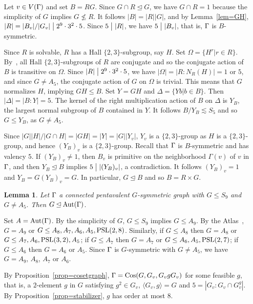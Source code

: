 \documentclass[12pt]{article}
\newtheorem{lem}{Lemma}[section]%
\def\di{\bigm|} \def\lg{\langle} \def\rg{\rangle}
\def\f{\noindent}
\def\PSL{\hbox{\rm PSL}}\def\PSU{\hbox{\rm PSU}}
\def\Aut{\hbox{\rm Aut}}
\def\Cos{\hbox{\rm Cos}}
\newcommand{\qed}{\mbox{\raisebox{0.7ex}{\fbox{}}} \vspace{4truemm}}
\begin{document}
\f {\bf Proof:} Let $v \in V(\Gamma)$ and set $B=RG$. Since $G\cap R\unlhd G$, we have  $G\cap R=1$ because the simplicity of $G$ implies $G\not\leq R$. It follows $|B|=|R||G|$, and by Lemma~\ref{lem=GH}, $|R|=|B_v|/|G_v|\di 2^9\cdot 3^2\cdot 5$. Since $5 \di |R|$, we have $5\di |B_v|$, that is, $\Gamma$ is $B$-symmetric.

Since $R$ is solvable, $R$ has a Hall $\{2,3\}$-subgroup, say $H$. Set $\Omega=\{H^r|r\in R\}$. By~\cite{Hall}, all Hall $\{2,3\}$-subgroups of $R$ are conjugate and so the conjugate action of $B$ is transitive on $\Omega$. Since $|R|\di 2^9\cdot 3^2\cdot 5$, we have $|\Omega|=|R:N_R(H)|=1$
or $5$, and since $G\neq A_5$, the conjugate action of $G$ on $\Omega$ is trivial. This means that $G$ normalizes $H$, implying $GH\leq B$. Set $Y=GH$ and $\Delta=\{Yb|b \in B\}$. Then $|\Delta|=|B:Y|=5$. The kernel of the right multiplication action of $B$ on $\Delta$ is $Y_B$, the largest normal subgroup of $B$ contained in $Y$. It follows $B/Y_B \lesssim S_5$ and so $G\leq Y_B$, as $G\neq A_5$.

Since $|G||H|/|G\cap H|=|GH|=|Y|=|G||Y_v|$, $Y_v$ is a $\{2,3\}$-group as $H$ is a $\{2,3\}$-group, and hence $(Y_B)_v$ is a $\{2,3\}$-group. Recall that $\Gamma$ is $B$-symmetric and has valency $5$.
If $(Y_B)_v\not=1$, then $B_v$ is primitive on the neighborhood $\Gamma(v)$ of $v$ in $\Gamma$, and then $Y_B\unlhd B$ implies $5\di |(Y_B)_v|$, a contradiction. It follows $(Y_B)_v=1$ and $Y_B=G(Y_B)_v=G$. In particular, $G\unlhd B$ and so $B=R\times G$.
\hfill\qed

\begin{lem}\label{lem=S_9}
Let $\Gamma$ a connected pentavalent $G$-symmetric graph with $G\leq S_9$ and $G\neq A_5$. Then $G\unlhd \Aut(\G)$.
\end{lem}

\f {\bf Proof:} Set $A=\Aut(\G)$. By the simplicity of $G$, $G\leq S_9$ implies $G\leq A_9$. By the Atlas~\cite[p. 37]{Atlas}, $G=A_9$ or $G\leq A_8, A_7, A_6,A_5,\PSL(2,8)$.
Similarly, if $G\leq A_8$ then $G=A_8$ or $G\leq A_7, A_6, \PSL(3,2),A_5$;
if $G\leq A_7$ then $G=A_7$ or $G\leq A_6, A_5, \PSL(2,7)$; if $G\leq A_6$
then $G=A_6$ or $A_5$. Since $\Gamma$ is $G$-symmetric with $G\neq A_5$, we have $G=A_9$, $A_8$, $A_7$ or $A_6$.

By Proposition~\ref{prop=cosetgraph}, $\G=\Cos(G,G_{v},G_{v}gG_{v})$ for some feasible $g$, that is, a $2$-element $g$ in $G$ satisfying $g^2\in G_{v}$,  $\langle G_v,g\rangle=G$ and $5=|G_v:G_v \cap G_{v}^{g}|$. By Proposition~\ref{prop=stabilizer}, $g$ has order at most $8$.
\end{document}
